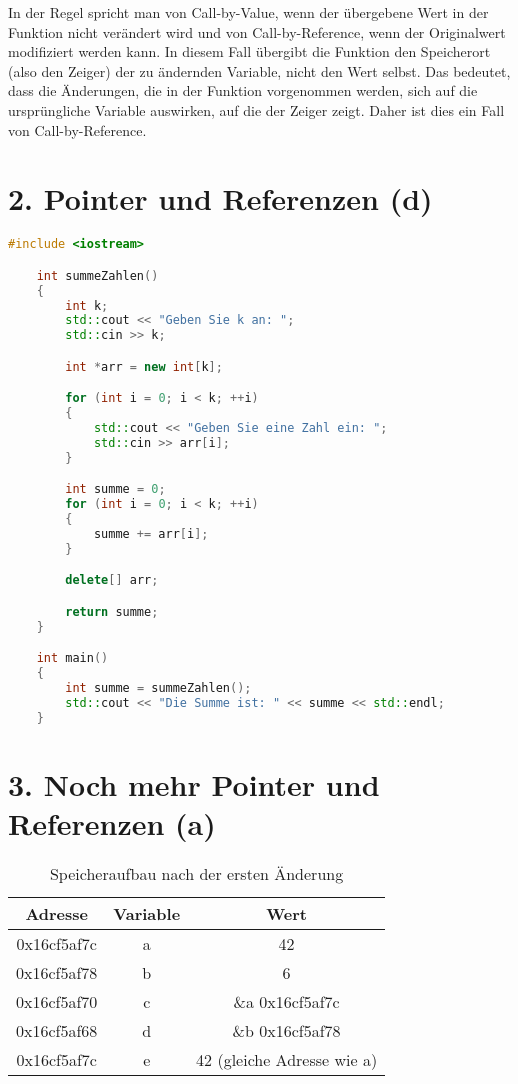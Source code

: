 \documentclass{article}
\begin{document}
\vspace*{0.5cm}

In der Regel spricht man von Call-by-Value, wenn der übergebene Wert in der Funktion nicht verändert wird und von Call-by-Reference, wenn der Originalwert modifiziert werden kann. In diesem Fall übergibt die Funktion den Speicherort (also den Zeiger) der zu ändernden Variable, nicht den Wert selbst. Das bedeutet, dass die Änderungen, die in der Funktion vorgenommen werden, sich auf die ursprüngliche Variable auswirken, auf die der Zeiger zeigt. Daher ist dies ein Fall von Call-by-Reference.

\section*{2. Pointer und Referenzen (d)}

\begin{lstlisting}[language=C++]
    #include <iostream>

    int summeZahlen()
    {
        int k;
        std::cout << "Geben Sie k an: ";
        std::cin >> k;

        int *arr = new int[k];

        for (int i = 0; i < k; ++i)
        {
            std::cout << "Geben Sie eine Zahl ein: ";
            std::cin >> arr[i];
        }

        int summe = 0;
        for (int i = 0; i < k; ++i)
        {
            summe += arr[i];
        }

        delete[] arr;

        return summe;
    }

    int main()
    {
        int summe = summeZahlen();
        std::cout << "Die Summe ist: " << summe << std::endl;
    }

\end{lstlisting}

\newpage

\section*{3. Noch mehr Pointer und Referenzen (a)}

\begin{table}[h]
    \centering
    \begin{tabular}{|c|c|c|}
        \hline
        \textbf{Adresse} & \textbf{Variable} & \textbf{Wert}              \\
        \hline
        0x16cf5af7c      & a                 & 42                         \\
        0x16cf5af78      & b                 & 6                          \\
        0x16cf5af70      & c                 & \&a 0x16cf5af7c            \\
        0x16cf5af68      & d                 & \&b 0x16cf5af78            \\
        0x16cf5af7c      & e                 & 42 (gleiche Adresse wie a) \\
        \hline
    \end{tabular}
    \caption{Speicheraufbau nach der ersten Änderung}
\end{table}
\end{document}
